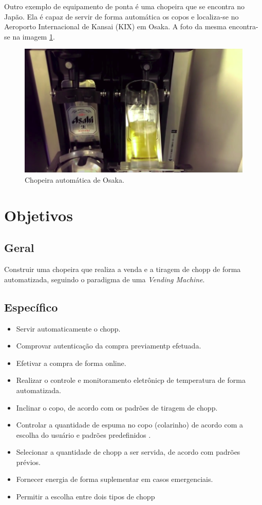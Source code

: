 	Outro exemplo de equipamento de ponta é uma chopeira  que se encontra no Japão. Ela é capaz de servir de forma 
	automática os copos e localiza-se no Aeroporto Internacional de Kansai (KIX) em Osaka. A foto da mesma encontra-se 
	na imagem \ref{exemplo-japao}.

	\begin{figure}[!htb]
		\centering
		\includegraphics[scale= 0.9]{figuras/exemplo-japao.png}
		\caption{Chopeira automática de Osaka.}
		\label{exemplo-japao}
	\end{figure}

	\section[Objetivos]{Objetivos}
		\subsection[Geral]{Geral}
			Construir uma chopeira que realiza a venda e a tiragem de chopp de forma automatizada, seguindo o 
			paradigma de uma \textit{Vending Machine}. 

		\subsection[Específico]{Específico}
			\begin{itemize}
				\item Servir automaticamente o chopp.
				\item Comprovar autenticação da compra previamentp efetuada.
				\item Efetivar a compra  de forma online. 
				\item Realizar o controle e monitoramento eletrônicp de temperatura de forma automatizada.
				\item Inclinar o copo, de acordo com os padrões de tiragem de chopp.
				\item Controlar a quantidade de espuma no copo (colarinho) de acordo com a escolha do usuário e padrões predefinidos .
				\item Selecionar a quantidade de chopp a ser servida, de acordo com padrões prévios.
				\item Fornecer energia de forma suplementar em casos emergenciais.
				\item Permitir a escolha entre dois tipos de chopp
			\end{itemize}
	
